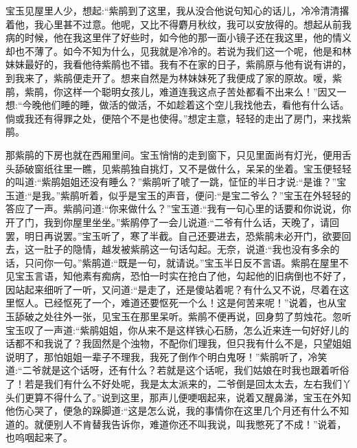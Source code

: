 \begin{parag}
    宝玉见屋里人少，想起:“紫鹃到了这里，我从没合他说句知心的话儿，冷冷清清撂着他，我心里甚不过意。他呢，又比不得麝月秋纹，我可以安放得的。想起从前我病的时候，他在我这里伴了好些时，如今他的那一面小镜子还在我这里，他的情义却也不薄了。如今不知为什么，见我就是冷冷的。若说为我们这一个呢，他是和林妹妹最好的，我看他待紫鹃也不错。我有不在家的日子，紫鹃原与他有说有讲的，到我来了，紫鹃便走开了。想来自然是为林妹妹死了我便成了家的原故。嗳，紫鹃，紫鹃，你这样一个聪明女孩儿，难道连我这点子苦处都看不出来么！”因又一想:“今晚他们睡的睡，做活的做活，不如趁着这个空儿我找他去，看他有什么话。倘或我还有得罪之处，便陪个不是也使得。”想定主意，轻轻的走出了房门，来找紫鹃。
\end{parag}


\begin{parag}
    那紫鹃的下房也就在西厢里间。宝玉悄悄的走到窗下，只见里面尚有灯光，便用舌头舔破窗纸往里一瞧，见紫鹃独自挑灯，又不是做什么，呆呆的坐着。宝玉便轻轻的叫道:“紫鹃姐姐还没有睡么？”紫鹃听了唬了一跳，怔怔的半日才说:“是谁？”宝玉道:“是我。”紫鹃听着，似乎是宝玉的声音，便问:“是宝二爷么？”宝玉在外轻轻的答应了一声。紫鹃问道:“你来做什么？”宝玉道:“我有一句心里的话要和你说说，你开了门，我到你屋里坐坐。”紫鹃停了一会儿说道:“二爷有什么话，天晚了，请回罢，明日再说罢。”宝玉听了，寒了半截。自己还要进去，恐紫鹃未必开门，欲要回去，这一肚子的隐情，越发被紫鹃这一句话勾起。无奈，说道:“我也没有多余的话，只问你一句。”紫鹃道:“既是一句，就请说。”宝玉半日反不言语。紫鹃在屋里不见宝玉言语，知他素有痴病，恐怕一时实在抢白了他，勾起他的旧病倒也不好了，因站起来细听了一听，又问道:“是走了，还是傻站着呢？有什么又不说，尽着在这里怄人。已经怄死了一个，难道还要怄死一个么！这是何苦来呢！”说着，也从宝玉舔破之处往外一张，见宝玉在那里呆听。紫鹃不便再说，回身剪了剪烛花。忽听宝玉叹了一声道:“紫鹃姐姐，你从来不是这样铁心石肠，怎么近来连一句好好儿的话都不和我说了？我固然是个浊物，不配你们理我，但只我有什么不是，只望姐姐说明了，那怕姐姐一辈子不理我，我死了倒作个明白鬼呀！”紫鹃听了，冷笑道:“二爷就是这个话呀，还有什么？若就是这个话呢，我们姑娘在时我也跟着听俗了！若是我们有什么不好处呢，我是太太派来的，二爷倒是回太太去，左右我们丫头们更算不得什么了。”说到这里，那声儿便哽咽起来，说着又醒鼻涕，宝玉在外知他伤心哭了，便急的跺脚道:“这是怎么说，我的事情你在这里几个月还有什么不知道的。就便别人不肯替我告诉你，难道你还不叫我说，叫我憋死了不成！”说着，也呜咽起来了。
\end{parag}


